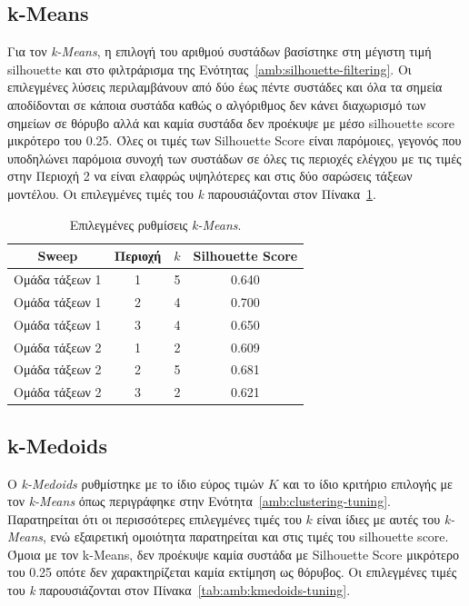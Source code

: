 \subsection{k-Means}

Για τον \textenglish{\textit{k-Means}}, η επιλογή του αριθμού συστάδων βασίστηκε στη
μέγιστη τιμή silhouette και στο φιλτράρισμα της Ενότητας~\ref{amb:silhouette-filtering}. Οι επιλεγμένες λύσεις περιλαμβάνουν από δύο έως
πέντε συστάδες και όλα τα σημεία αποδίδονται σε κάποια συστάδα καθώς ο αλγόριθμος δεν κάνει διαχωρισμό των σημείων σε θόρυβο αλλά και καμία συστάδα δεν προέκυψε με μέσο silhouette score μικρότερο του 0.25. Όλες οι τιμές των Silhouette Score είναι παρόμοιες, γεγονός που υποδηλώνει παρόμοια συνοχή των συστάδων σε όλες τις περιοχές ελέγχου με τις τιμές στην Περιοχή 2 να είναι ελαφρώς υψηλότερες και στις δύο σαρώσεις τάξεων μοντέλου. Οι επιλεγμένες τιμές του \textit{k} παρουσιάζονται στον Πίνακα~\ref{tab:amb:kmeans-tuning}.

\begin{table}[htbp]
    \centering
    \caption{Επιλεγμένες ρυθμίσεις \textenglish{\textit{k-Means}}.}
    \label{tab:amb:kmeans-tuning}
    \begin{tabular}{cccc}
        \toprule
        Sweep & Περιοχή & $k$ & Silhouette Score \\
        \midrule
        Ομάδα τάξεων 1 & 1 & 5 & 0.640 \\
        Ομάδα τάξεων 1 & 2 & 4 & 0.700 \\
        Ομάδα τάξεων 1 & 3 & 4 & 0.650 \\
        Ομάδα τάξεων 2 & 1 & 2 & 0.609 \\
        Ομάδα τάξεων 2 & 2 & 5 & 0.681 \\
        Ομάδα τάξεων 2 & 3 & 2 & 0.621 \\
        \bottomrule
    \end{tabular}
\end{table}

\subsection{k-Medoids}

Ο \textenglish{\textit{k-Medoids}} ρυθμίστηκε με το ίδιο εύρος τιμών $K$ και το ίδιο
κριτήριο επιλογής με τον \textenglish{\textit{k-Means}} όπως περιγράφηκε στην Ενότητα~\ref{amb:clustering-tuning}. Παρατηρείται ότι οι περισσότερες επιλεγμένες τιμές του $k$ είναι ίδιες με αυτές του \textenglish{\textit{k-Means}}, ενώ εξαιρετική ομοιότητα παρατηρείται και στις τιμές του silhouette score. Όμοια με τον k-Means, δεν προέκυψε καμία συστάδα με Silhouette Score μικρότερο του 0.25 οπότε δεν χαρακτηρίζεται καμία εκτίμηση ως θόρυβος. Οι επιλεγμένες τιμές του \textit{k} παρουσιάζονται στον Πίνακα~\ref{tab:amb:kmedoids-tuning}.

